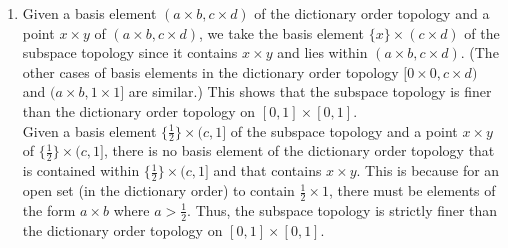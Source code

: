 \documentclass{article}
\begin{document}
\begin{enumerate}
\item
Given a basis element $(a \times b,c\times d)$ of the dictionary order topology and a point $x\times y$ of $(a \times b,c\times d)$, we take the basis element $\{x\}\times (c\times d)$ of the subspace topology since it contains $x \times y$ and lies within $(a \times b,c\times d)$. (The other cases of basis elements in the dictionary order topology $[0\times 0, c\times d)$ and $(a\times b, 1\times 1]$ are similar.) This shows that the subspace topology is finer than the dictionary order topology on $[0,1] \times [0,1]$. 
\\Given a basis element $\{\frac{1}{2}\} \times (c, 1]$ of the subspace topology and a point $x\times y$ of $\{\frac{1}{2}\} \times (c, 1]$, there is no basis element of the dictionary order topology that is contained within $\{\frac{1}{2}\} \times (c, 1]$ and that contains $x \times y$. This is because for an open set (in the dictionary order) to contain $\frac{1}{2} \times 1$, there must be elements of the form $a \times b$ where $a>\frac{1}{2}$. Thus, the subspace topology is strictly finer than the dictionary order topology on $[0,1] \times [0,1]$. 

\end{enumerate}
\end{document}
